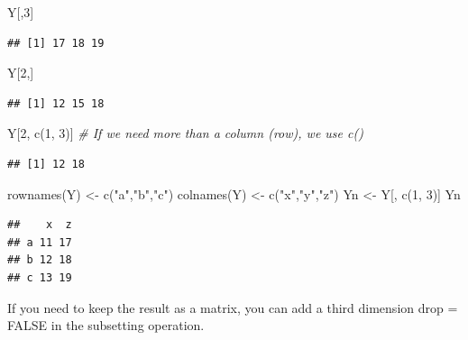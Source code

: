 \documentclass[
]{book}
\newenvironment{Shaded}{\begin{snugshade}}{\end{snugshade}}
\newcommand{\CommentTok}[1]{\textcolor[rgb]{0.56,0.35,0.01}{\textit{#1}}}
\newcommand{\DecValTok}[1]{\textcolor[rgb]{0.00,0.00,0.81}{#1}}
\newcommand{\FunctionTok}[1]{\textcolor[rgb]{0.00,0.00,0.00}{#1}}
\newcommand{\NormalTok}[1]{#1}
\newcommand{\OtherTok}[1]{\textcolor[rgb]{0.56,0.35,0.01}{#1}}
\newcommand{\StringTok}[1]{\textcolor[rgb]{0.31,0.60,0.02}{#1}}
\theoremstyle{definition}
\theoremstyle{definition}
\theoremstyle{definition}
\theoremstyle{definition}
\theoremstyle{remark}
\begin{document}
\begin{Shaded}
\begin{Highlighting}[]
\NormalTok{Y[,}\DecValTok{3}\NormalTok{]}
\end{Highlighting}
\end{Shaded}

\begin{verbatim}
## [1] 17 18 19
\end{verbatim}

\begin{Shaded}
\begin{Highlighting}[]
\NormalTok{Y[}\DecValTok{2}\NormalTok{,]}
\end{Highlighting}
\end{Shaded}

\begin{verbatim}
## [1] 12 15 18
\end{verbatim}

\begin{Shaded}
\begin{Highlighting}[]
\NormalTok{Y[}\DecValTok{2}\NormalTok{, }\FunctionTok{c}\NormalTok{(}\DecValTok{1}\NormalTok{, }\DecValTok{3}\NormalTok{)] }\CommentTok{\# If we need more than a column (row), we use c()}
\end{Highlighting}
\end{Shaded}

\begin{verbatim}
## [1] 12 18
\end{verbatim}

\begin{Shaded}
\begin{Highlighting}[]
\FunctionTok{rownames}\NormalTok{(Y) }\OtherTok{\textless{}{-}} \FunctionTok{c}\NormalTok{(}\StringTok{"a"}\NormalTok{,}\StringTok{"b"}\NormalTok{,}\StringTok{"c"}\NormalTok{)}
\FunctionTok{colnames}\NormalTok{(Y) }\OtherTok{\textless{}{-}} \FunctionTok{c}\NormalTok{(}\StringTok{"x"}\NormalTok{,}\StringTok{"y"}\NormalTok{,}\StringTok{"z"}\NormalTok{)}
\NormalTok{Yn }\OtherTok{\textless{}{-}}\NormalTok{ Y[, }\FunctionTok{c}\NormalTok{(}\DecValTok{1}\NormalTok{, }\DecValTok{3}\NormalTok{)]}
\NormalTok{Yn}
\end{Highlighting}
\end{Shaded}

\begin{verbatim}
##    x  z
## a 11 17
## b 12 18
## c 13 19
\end{verbatim}

If you need to keep the result as a matrix, you can add a third dimension drop = FALSE in the subsetting operation.
\end{document}
